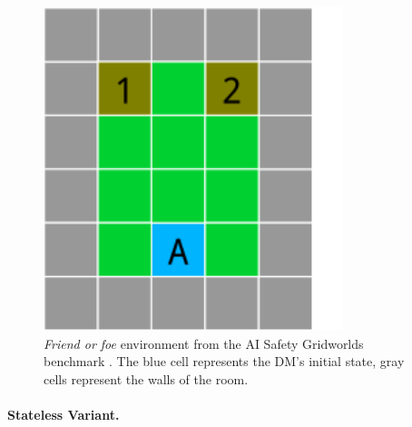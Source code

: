 \begin{figure}
   \centering
   \includegraphics[scale=0.5]{figures/friend-or-foeCUT}
   \caption{\emph{Friend or foe} environment from the AI Safety Gridworlds benchmark \cite{leike2017ai}.
   The blue cell 
represents the DM's initial state, gray cells represent the walls of the room.   } \label{fig:friendorfoe}
 \end{figure}


\paragraph{Stateless Variant.}\label{sec:statv}

